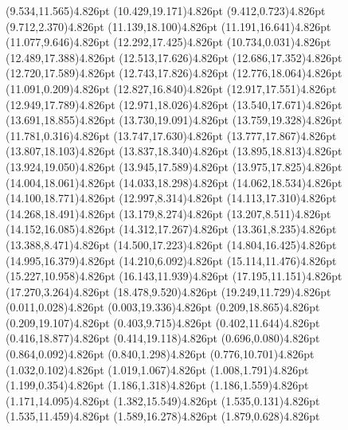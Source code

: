 \documentclass[10pt]{article}
\begin{document}
{{\qdisk(9.534,11.565){4.826pt}%
\qdisk(10.429,19.171){4.826pt}%
\qdisk(9.412,0.723){4.826pt}%
\qdisk(9.712,2.370){4.826pt}%
\qdisk(11.139,18.100){4.826pt}%
\qdisk(11.191,16.641){4.826pt}%
\qdisk(11.077,9.646){4.826pt}%
\qdisk(12.292,17.425){4.826pt}%
\qdisk(10.734,0.031){4.826pt}%
\qdisk(12.489,17.388){4.826pt}%
\qdisk(12.513,17.626){4.826pt}%
\qdisk(12.686,17.352){4.826pt}%
\qdisk(12.720,17.589){4.826pt}%
\qdisk(12.743,17.826){4.826pt}%
\qdisk(12.776,18.064){4.826pt}%
\qdisk(11.091,0.209){4.826pt}%
\qdisk(12.827,16.840){4.826pt}%
\qdisk(12.917,17.551){4.826pt}%
\qdisk(12.949,17.789){4.826pt}%
\qdisk(12.971,18.026){4.826pt}%
\qdisk(13.540,17.671){4.826pt}%
\qdisk(13.691,18.855){4.826pt}%
\qdisk(13.730,19.091){4.826pt}%
\qdisk(13.759,19.328){4.826pt}%
\qdisk(11.781,0.316){4.826pt}%
\qdisk(13.747,17.630){4.826pt}%
\qdisk(13.777,17.867){4.826pt}%
\qdisk(13.807,18.103){4.826pt}%
\qdisk(13.837,18.340){4.826pt}%
\qdisk(13.895,18.813){4.826pt}%
\qdisk(13.924,19.050){4.826pt}%
\qdisk(13.945,17.589){4.826pt}%
\qdisk(13.975,17.825){4.826pt}%
\qdisk(14.004,18.061){4.826pt}%
\qdisk(14.033,18.298){4.826pt}%
\qdisk(14.062,18.534){4.826pt}%
\qdisk(14.100,18.771){4.826pt}%
\qdisk(12.997,8.314){4.826pt}%
\qdisk(14.113,17.310){4.826pt}%
\qdisk(14.268,18.491){4.826pt}%
\qdisk(13.179,8.274){4.826pt}%
\qdisk(13.207,8.511){4.826pt}%
\qdisk(14.152,16.085){4.826pt}%
\qdisk(14.312,17.267){4.826pt}%
\qdisk(13.361,8.235){4.826pt}%
\qdisk(13.388,8.471){4.826pt}%
\qdisk(14.500,17.223){4.826pt}%
\qdisk(14.804,16.425){4.826pt}%
\qdisk(14.995,16.379){4.826pt}%
\qdisk(14.210,6.092){4.826pt}%
\qdisk(15.114,11.476){4.826pt}%
\qdisk(15.227,10.958){4.826pt}%
\qdisk(16.143,11.939){4.826pt}%
\qdisk(17.195,11.151){4.826pt}%
\qdisk(17.270,3.264){4.826pt}%
\qdisk(18.478,9.520){4.826pt}%
\qdisk(19.249,11.729){4.826pt}%
\dummycolor
\qdisk(0.011,0.028){4.826pt}%
\qdisk(0.003,19.336){4.826pt}%
\qdisk(0.209,18.865){4.826pt}%
\qdisk(0.209,19.107){4.826pt}%
\qdisk(0.403,9.715){4.826pt}%
\qdisk(0.402,11.644){4.826pt}%
\qdisk(0.416,18.877){4.826pt}%
\qdisk(0.414,19.118){4.826pt}%
\qdisk(0.696,0.080){4.826pt}%
\qdisk(0.864,0.092){4.826pt}%
\qdisk(0.840,1.298){4.826pt}%
\qdisk(0.776,10.701){4.826pt}%
\qdisk(1.032,0.102){4.826pt}%
\qdisk(1.019,1.067){4.826pt}%
\qdisk(1.008,1.791){4.826pt}%
\qdisk(1.199,0.354){4.826pt}%
\qdisk(1.186,1.318){4.826pt}%
\qdisk(1.186,1.559){4.826pt}%
\qdisk(1.171,14.095){4.826pt}%
\qdisk(1.382,15.549){4.826pt}%
\qdisk(1.535,0.131){4.826pt}%
\qdisk(1.535,11.459){4.826pt}%
\qdisk(1.589,16.278){4.826pt}%
\qdisk(1.879,0.628){4.826pt}%
}}
\end{document}
